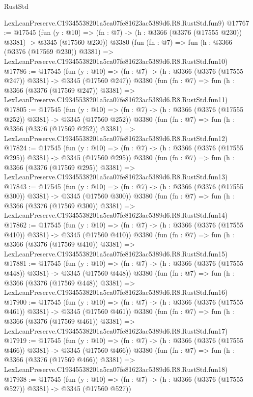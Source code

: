 \begin{lexlean}{RustStd}
\begin{coremodule}
    LexLeanPreserve.C19345538201a5ca07fe81623ac5389d6.R8.RustStd.fun9)
@17767 := @17545
    (fun (y : @10) => (fn : @7) -> (h : @3366 (@3376 (@17555 @230)) @3381) -> @3345 (@17560 @230))
    @3380
    (fun (fn : @7) =>
    fun (h : @3366 (@3376 (@17569 @230)) @3381) =>
    LexLeanPreserve.C19345538201a5ca07fe81623ac5389d6.R8.RustStd.fun10)
@17786 := @17545
    (fun (y : @10) => (fn : @7) -> (h : @3366 (@3376 (@17555 @247)) @3381) -> @3345 (@17560 @247))
    @3380
    (fun (fn : @7) =>
    fun (h : @3366 (@3376 (@17569 @247)) @3381) =>
    LexLeanPreserve.C19345538201a5ca07fe81623ac5389d6.R8.RustStd.fun11)
@17805 := @17545
    (fun (y : @10) => (fn : @7) -> (h : @3366 (@3376 (@17555 @252)) @3381) -> @3345 (@17560 @252))
    @3380
    (fun (fn : @7) =>
    fun (h : @3366 (@3376 (@17569 @252)) @3381) =>
    LexLeanPreserve.C19345538201a5ca07fe81623ac5389d6.R8.RustStd.fun12)
@17824 := @17545
    (fun (y : @10) => (fn : @7) -> (h : @3366 (@3376 (@17555 @295)) @3381) -> @3345 (@17560 @295))
    @3380
    (fun (fn : @7) =>
    fun (h : @3366 (@3376 (@17569 @295)) @3381) =>
    LexLeanPreserve.C19345538201a5ca07fe81623ac5389d6.R8.RustStd.fun13)
@17843 := @17545
    (fun (y : @10) => (fn : @7) -> (h : @3366 (@3376 (@17555 @300)) @3381) -> @3345 (@17560 @300))
    @3380
    (fun (fn : @7) =>
    fun (h : @3366 (@3376 (@17569 @300)) @3381) =>
    LexLeanPreserve.C19345538201a5ca07fe81623ac5389d6.R8.RustStd.fun14)
@17862 := @17545
    (fun (y : @10) => (fn : @7) -> (h : @3366 (@3376 (@17555 @410)) @3381) -> @3345 (@17560 @410))
    @3380
    (fun (fn : @7) =>
    fun (h : @3366 (@3376 (@17569 @410)) @3381) =>
    LexLeanPreserve.C19345538201a5ca07fe81623ac5389d6.R8.RustStd.fun15)
@17881 := @17545
    (fun (y : @10) => (fn : @7) -> (h : @3366 (@3376 (@17555 @448)) @3381) -> @3345 (@17560 @448))
    @3380
    (fun (fn : @7) =>
    fun (h : @3366 (@3376 (@17569 @448)) @3381) =>
    LexLeanPreserve.C19345538201a5ca07fe81623ac5389d6.R8.RustStd.fun16)
@17900 := @17545
    (fun (y : @10) => (fn : @7) -> (h : @3366 (@3376 (@17555 @461)) @3381) -> @3345 (@17560 @461))
    @3380
    (fun (fn : @7) =>
    fun (h : @3366 (@3376 (@17569 @461)) @3381) =>
    LexLeanPreserve.C19345538201a5ca07fe81623ac5389d6.R8.RustStd.fun17)
@17919 := @17545
    (fun (y : @10) => (fn : @7) -> (h : @3366 (@3376 (@17555 @466)) @3381) -> @3345 (@17560 @466))
    @3380
    (fun (fn : @7) =>
    fun (h : @3366 (@3376 (@17569 @466)) @3381) =>
    LexLeanPreserve.C19345538201a5ca07fe81623ac5389d6.R8.RustStd.fun18)
@17938 := @17545
    (fun (y : @10) => (fn : @7) -> (h : @3366 (@3376 (@17555 @527)) @3381) -> @3345 (@17560 @527))

\end{coremodule}
\end{lexlean}
